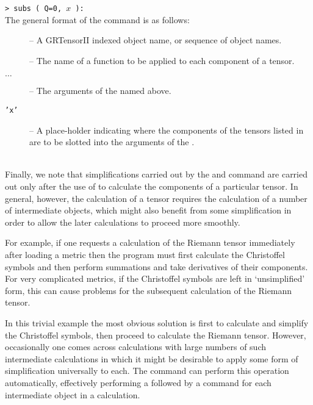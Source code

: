 \documentclass{article}
\begin{document}
{{{\noindent\texttt{> subs ( Q=0, $x$ ):}\\

\noindent The general format of the  command is as follows:\\
%
\begin{cmdspec}
  \label{spec:grmap}

  \begin{description}
    \item[] -- A GRTensorII indexed object name, or sequence 
      of object names.
    \item[] -- The name of a function to be applied to each
      component of a tensor.
    \item[ $\ldots$ ] -- The arguments of the
       named above.
    \item[\texttt{'x'}] -- A place-holder indicating where the components
      of the tensors listed in  are to be slotted into
      the arguments of the .
  \end{description}

\end{cmdspec}\\[\baselineskip]

Finally, we note that simplifications carried out by the
 and  command are carried out only after
the use of  to calculate the components of a particular
tensor. In general, however, the calculation of a tensor requires the
calculation of a number of intermediate objects, which might also
benefit from some simplification in order to allow the later
calculations to proceed more smoothly.

For example, if one requests a calculation of the Riemann tensor
immediately after loading a metric then the program must first
calculate the Christoffel symbols and then perform summations and take
derivatives of their components. For very complicated metrics, if the
Christoffel symbols are left in `unsimplified' form, this can cause
problems for the subsequent calculation of the Riemann tensor.

In this trivial example the most obvious solution is first to
calculate and simplify the Christoffel symbols, then proceed to
calculate the Riemann tensor. However, occasionally one comes across
calculations with large numbers of such intermediate calculations in
which it might be desirable to apply some form of simplification
universally to each. The  command can perform this
operation automatically, effectively performing a 
followed by a  command for each intermediate object in
a calculation.\\
%
\begin{cmdspec}
  \label{spec:grcalcalter}


\end{cmdspec}}}}
\end{document}
